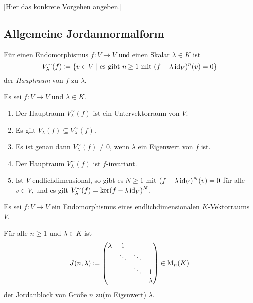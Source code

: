 [Hier das konkrete Vorgehen angeben.]










\subsection{Allgemeine Jordannormalform}


\begin{definition}
  Für einen Endomorphismus $f \colon V \to V$ und einen Skalar $\lambda \in K$ ist
  \[
    V^\sim_\lambda(f)
    \coloneqq
    \{
      v \in V
      \mid
      \text{es gibt $n \geq 1$ mit $(f - \lambda \operatorname{id}_V)^n(v) = 0$}
    \}
  \]
  der \emph{Hauptraum} von $f$ zu $\lambda$.
\end{definition}


\begin{lemma}
  Es sei $f \colon V \to V$ und $\lambda \in K$.
  \begin{enumerate}[leftmargin=*, label=\roman*)]
    \item
      Der Hauptraum $V^\sim_\lambda(f)$ ist ein Untervektorraum von $V$.
    \item
      Es gilt $V_\lambda(f) \subseteq V^\sim_\lambda(f)$.
    \item
      Es ist genau dann $V^\sim_\lambda(f) \neq 0$, wenn $\lambda$ ein Eigenwert von $f$ ist.
    \item
      Der Hauptraum $V^\sim_\lambda(f)$ ist $f$-invariant.
    \item
      Ist $V$ endlichdimensional, so gibt es $N \geq 1$ mit $(f - \lambda \operatorname{id}_V)^N(v) = 0$ für alle $v \in V$, und es gilt $V^\sim_\lambda(f) = \ker (f - \lambda \operatorname{id}_V)^N$.
  \end{enumerate}
\end{lemma}


\begin{lemma}
  Es sei $f \colon V \to V$ ein Endomorphismus eines endlichdimensionalen $K$-Vek\-tor\-raums $V$.
\end{lemma}


\begin{notation}
  Für alle $n \geq 1$ und $\lambda \in K$ ist
  \[
    J(n, \lambda)
    \coloneqq
    \begin{pmatrix}
      \lambda & 1       &         &         \\
              & \ddots  & \ddots  &         \\
              &         & \ddots  & 1       \\
              &         &         & \lambda
    \end{pmatrix}
    \in \mathrm{M}_n(K)
  \]
  der Jordanblock von Größe $n$ zu(m Eigenwert) $\lambda$.
\end{notation}


